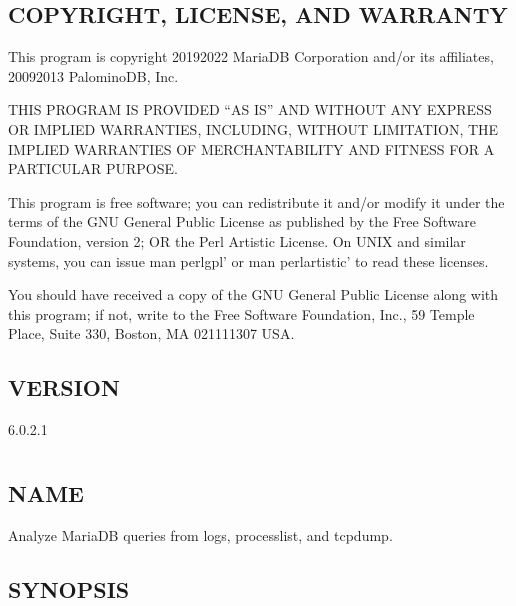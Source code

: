 \documentclass[letterpaper,10pt,english]{sphinxmanual}
\begin{document}
\section{COPYRIGHT, LICENSE, AND WARRANTY}
\label{\detokenize{mariadb-parted:copyright-license-and-warranty}}
This program is copyright 2019\sphinxhyphen{}2022 MariaDB Corporation and/or its affiliates,
2009\sphinxhyphen{}2013 PalominoDB, Inc.

THIS PROGRAM IS PROVIDED “AS IS” AND WITHOUT ANY EXPRESS OR IMPLIED
WARRANTIES, INCLUDING, WITHOUT LIMITATION, THE IMPLIED WARRANTIES OF
MERCHANTABILITY AND FITNESS FOR A PARTICULAR PURPOSE.

This program is free software; you can redistribute it and/or modify it under
the terms of the GNU General Public License as published by the Free Software
Foundation, version 2; OR the Perl Artistic License.  On UNIX and similar
systems, you can issue \textasciigrave{}man perlgpl’ or \textasciigrave{}man perlartistic’ to read these
licenses.

You should have received a copy of the GNU General Public License along with
this program; if not, write to the Free Software Foundation, Inc., 59 Temple
Place, Suite 330, Boston, MA  02111\sphinxhyphen{}1307  USA.


\section{VERSION}
\label{\detokenize{mariadb-parted:version}}
 6.0.2.1


\chapter{}
\label{\detokenize{mariadb-query-digest:mariadb-query-digest}}\label{\detokenize{mariadb-query-digest::doc}}

\section{NAME}
\label{\detokenize{mariadb-query-digest:name}}
 \sphinxhyphen{} Analyze MariaDB queries from logs, processlist, and tcpdump.


\section{SYNOPSIS}
\label{\detokenize{mariadb-query-digest:synopsis}}
\end{document}
